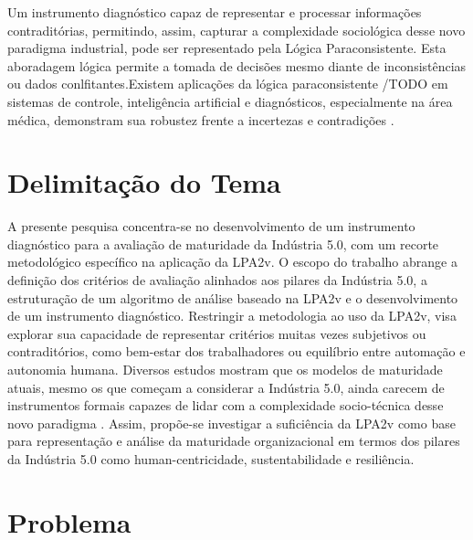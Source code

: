 Um instrumento diagnóstico capaz de representar e processar informações contraditórias, permitindo, assim, capturar a complexidade sociológica desse novo paradigma industrial, pode ser representado pela Lógica Paraconsistente.
Esta aboradagem lógica permite a tomada de decisões mesmo diante de inconsistências ou dados conlfitantes.Existem aplicações da lógica paraconsistente /TODO em sistemas de controle, inteligência artificial e diagnósticos, especialmente na área médica, demonstram sua robustez frente a incertezas e contradições \cite{SilvaFilho1999, CarvalhoBrunsteinAbe2003, CarvalhoJunior2024}.

 


\section{Delimitação do Tema}

A presente pesquisa concentra-se no desenvolvimento de um instrumento diagnóstico para a avaliação de maturidade da Indústria 5.0, com um recorte metodológico específico na aplicação da \gls{LPA2v}.
O escopo do trabalho abrange a definição dos critérios de avaliação alinhados aos pilares da Indústria 5.0, a estruturação de um algoritmo de análise baseado na \gls{LPA2v} e o desenvolvimento de um instrumento diagnóstico.
Restringir a metodologia ao uso da \gls{LPA2v}, visa explorar sua capacidade de representar critérios muitas vezes subjetivos ou contraditórios, como bem-estar dos trabalhadores ou equilíbrio entre automação e autonomia humana.
Diversos estudos mostram que os modelos de maturidade atuais, mesmo os que começam a considerar a Indústria 5.0, ainda carecem de instrumentos formais capazes de lidar com a complexidade socio-técnica desse novo paradigma \cite{BARO2025, HeinPensel2023}.
Assim, propõe-se investigar a suficiência da \gls{LPA2v} como base para representação e análise da maturidade organizacional em termos dos pilares da Indústria 5.0 como human-centricidade, sustentabilidade e resiliência.

\section{Problema}

